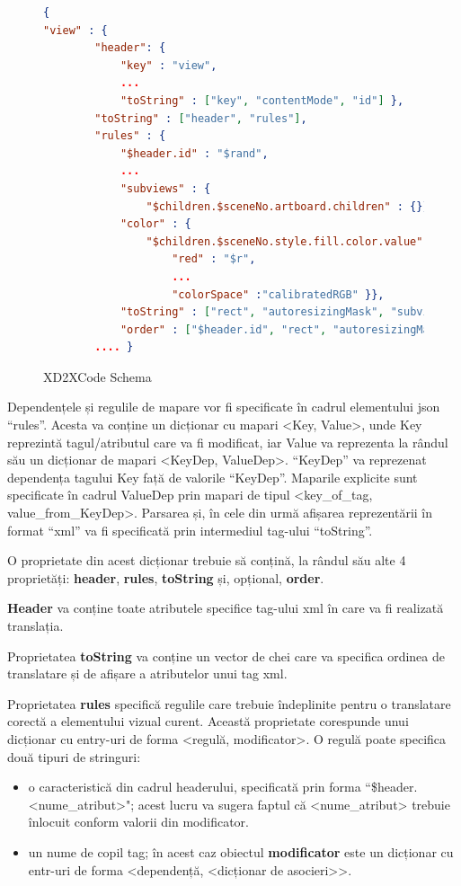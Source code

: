 \begin{figure}
\begin{lstlisting}[language=json,firstnumber=1]
{
"view" : {
        "header": {
            "key" : "view",
            ...
            "toString" : ["key", "contentMode", "id"] },
        "toString" : ["header", "rules"],
        "rules" : { 
            "$header.id" : "$rand",
            ...
            "subviews" : {
                "$children.$sceneNo.artboard.children" : {}},
            "color" : {
                "$children.$sceneNo.style.fill.color.value" : {
                    "red" : "$r",
                    ...
                    "colorSpace" :"calibratedRGB" }},
            "toString" : ["rect", "autoresizingMask", "subviews", "color"],
            "order" : ["$header.id", "rect", "autoresizingMask", "color", "subviews"] }
        .... }
\end{lstlisting}
\caption{XD2XCode Schema} \label{fig:XD2XCode Schema}
\end{figure}




Dependențele și regulile de mapare vor fi specificate în cadrul elementului json “rules”. Acesta va conține un dicționar cu mapari <Key, Value>, unde Key reprezintă tagul/atributul care va fi modificat, iar Value va reprezenta la rândul său un dicționar de mapari <KeyDep, ValueDep>.  “KeyDep” va reprezenat dependența tagului Key față de valorile “KeyDep”. Maparile explicite sunt specificate în cadrul ValueDep prin mapari de tipul <key_of_tag, value_from_KeyDep>. 
Parsarea și, în cele din urmă afișarea reprezentării în format “xml” va fi specificată prin intermediul tag-ului “toString”. 

O proprietate din acest dicționar trebuie să conțină, la rândul său alte 4 proprietăți: \textbf{header}, \textbf{rules}, \textbf{toString} și, opțional, \textbf{order}. 

\textbf{Header} va conține toate atributele specifice tag-ului xml în care va fi realizată translația. 

Proprietatea \textbf{toString} va conține un vector de chei care va specifica ordinea de translatare și de afișare a atributelor unui tag xml. 

Proprietatea \textbf{rules} specifică regulile care trebuie îndeplinite pentru o translatare corectă a elementului vizual curent. Această proprietate corespunde unui dicționar cu entry-uri de forma <regulă, modificator>.
O regulă poate specifica două tipuri de stringuri:

\begin{itemize}  
\item o caracteristică din cadrul headerului, specificată prin forma ``\$header.<nume_atribut>"; acest lucru va sugera faptul că <nume_atribut> trebuie înlocuit conform valorii  din modificator.
\item un nume de copil tag; în acest caz obiectul \textbf{modificator} este un dicționar cu entr-uri de forma <dependență, <dicționar de asocieri>>.
\end{itemize}
 

